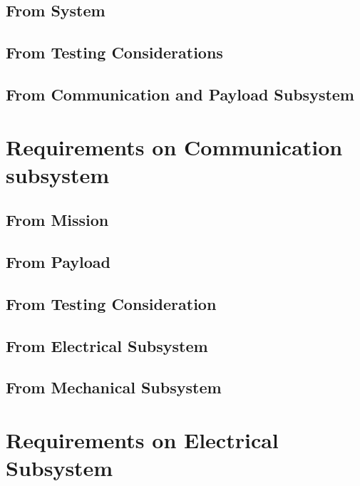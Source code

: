 \subsection{From System}
\subsection{From Testing Considerations}
\subsection{From Communication and Payload \mbox{Subsystem} }


\newpage
\section{Requirements on Communication subsystem}
\subsection{From Mission}
\subsection{From Payload}
\subsection{From Testing Consideration}
\subsection{From Electrical Subsystem}
\subsection{From Mechanical Subsystem}


\newpage
\section{Requirements on Electrical Subsystem}
